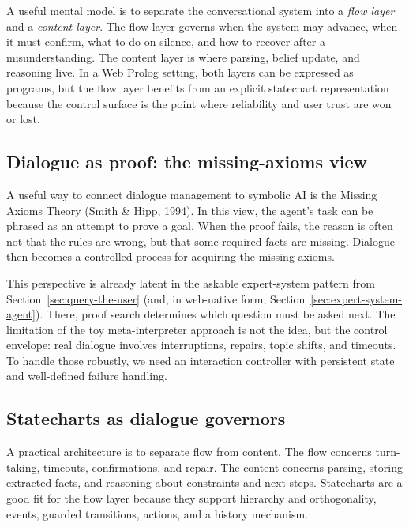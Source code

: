 A useful mental model is to separate the conversational system into a \emph{flow layer} and a \emph{content layer}. The flow layer governs when the system may advance, when it must confirm, what to do on silence, and how to recover after a misunderstanding. The content layer is where parsing, belief update, and reasoning live. In a Web Prolog setting, both layers can be expressed as programs, but the flow layer benefits from an explicit statechart representation because the control surface is the point where reliability and user trust are won or lost.

\subsection{Dialogue as proof: the missing-axioms view}
\label{sec:missing-axioms-theory}

A useful way to connect dialogue management to symbolic AI is the Missing Axioms Theory (Smith \& Hipp, 1994). In this view, the agent's task can be phrased as an attempt to prove a goal. When the proof fails, the reason is often not that the rules are wrong, but that some required facts are missing. Dialogue then becomes a controlled process for acquiring the missing axioms.

This perspective is already latent in the askable expert-system pattern from Section~\ref{sec:query-the-user} (and, in web-native form, Section~\ref{sec:expert-system-agent}). There, proof search determines which question must be asked next. The limitation of the toy meta-interpreter approach is not the idea, but the control envelope: real dialogue involves interruptions, repairs, topic shifts, and timeouts. To handle those robustly, we need an interaction controller with persistent state and well-defined failure handling.

\subsection{Statecharts as dialogue governors}
\label{sec:statecharts-as-dialogue-governors}

A practical architecture is to separate flow from content. The flow concerns turn-taking, timeouts, confirmations, and repair. The content concerns parsing, storing extracted facts, and reasoning about constraints and next steps. Statecharts are a good fit for the flow layer because they support hierarchy and orthogonality, events, guarded transitions, actions, and a history mechanism.

